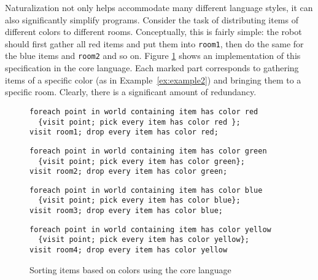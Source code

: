 \begin{example}
\label{ex:definingAFunction}
Naturalization not only helps accommodate many different language styles, it can also significantly simplify programs.
Consider the task of distributing items of different colors to different rooms.
Conceptually, this is fairly simple: the robot should first gather all red items and put them into \lstinline{room1},
then do the same for the blue items and \lstinline{room2} and so on.
Figure \ref{fig:coreLanguageDefinitionOfSortingOnColors} shows an implementation of this specification in the core language.
Each marked part corresponds to gathering items of a specific color (as in Example~\ref{ex:example2}) and bringing
them to a specific room.
Clearly, there is a significant amount of redundancy.
\begin{figure}[t!]
  \begin{lstlisting}[frame=leftline,xleftmargin=15pt, xrightmargin=15pt]
foreach point in world containing item has color red
  {visit point; pick every item has color red };
visit room1; drop every item has color red;
  \end{lstlisting}

  \begin{lstlisting}[frame=leftline,xleftmargin=15pt, xrightmargin=15pt]
foreach point in world containing item has color green
  {visit point; pick every item has color green};
visit room2; drop every item has color green;
  \end{lstlisting}

  \begin{lstlisting}[frame=leftline,xleftmargin=15pt, xrightmargin=15pt]
foreach point in world containing item has color blue
  {visit point; pick every item has color blue};
visit room3; drop every item has color blue;
  \end{lstlisting}

  \begin{lstlisting}[frame=leftline,xleftmargin=15pt, xrightmargin=15pt]
foreach point in world containing item has color yellow
  {visit point; pick every item has color yellow};
visit room4; drop every item has color yellow
  \end{lstlisting}
\caption{Sorting items based on colors using the core language}
\label{fig:coreLanguageDefinitionOfSortingOnColors}
\end{figure}


\end{example}
